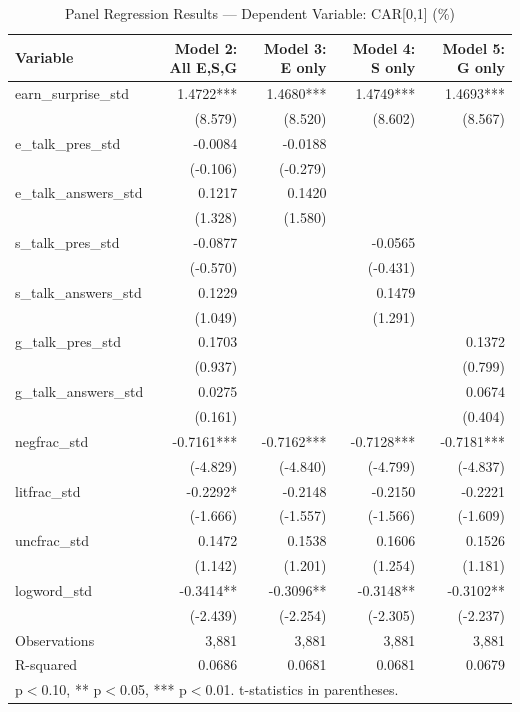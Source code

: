 \begin{table}[htbp]
\centering
\caption{Panel Regression Results — Dependent Variable: CAR[0,1] (\%)}
\begin{tabular}{lrrrr}
\hline\hline
Variable & Model 2: All E,S,G & Model 3: E only & Model 4: S only & Model 5: G only \\
\hline
earn\_surprise\_std & 1.4722*** & 1.4680*** & 1.4749*** & 1.4693*** \\
 & (8.579) & (8.520) & (8.602) & (8.567) \\
e\_talk\_pres\_std & -0.0084 & -0.0188 &  &  \\
 & (-0.106) & (-0.279) &  &  \\
e\_talk\_answers\_std & 0.1217 & 0.1420 &  &  \\
 & (1.328) & (1.580) &  &  \\
s\_talk\_pres\_std & -0.0877 &  & -0.0565 &  \\
 & (-0.570) &  & (-0.431) &  \\
s\_talk\_answers\_std & 0.1229 &  & 0.1479 &  \\
 & (1.049) &  & (1.291) &  \\
g\_talk\_pres\_std & 0.1703 &  &  & 0.1372 \\
 & (0.937) &  &  & (0.799) \\
g\_talk\_answers\_std & 0.0275 &  &  & 0.0674 \\
 & (0.161) &  &  & (0.404) \\
negfrac\_std & -0.7161*** & -0.7162*** & -0.7128*** & -0.7181*** \\
 & (-4.829) & (-4.840) & (-4.799) & (-4.837) \\
litfrac\_std & -0.2292* & -0.2148 & -0.2150 & -0.2221 \\
 & (-1.666) & (-1.557) & (-1.566) & (-1.609) \\
uncfrac\_std & 0.1472 & 0.1538 & 0.1606 & 0.1526 \\
 & (1.142) & (1.201) & (1.254) & (1.181) \\
logword\_std & -0.3414** & -0.3096** & -0.3148** & -0.3102** \\
 & (-2.439) & (-2.254) & (-2.305) & (-2.237) \\
\hline
Observations & 3,881 & 3,881 & 3,881 & 3,881 \\
R-squared & 0.0686 & 0.0681 & 0.0681 & 0.0679 \\
\hline\hline
\multicolumn{5}{l}{\footnotesize * p$<$0.10, ** p$<$0.05, *** p$<$0.01. t-statistics in parentheses.}\\
\end{tabular}
\end{table}